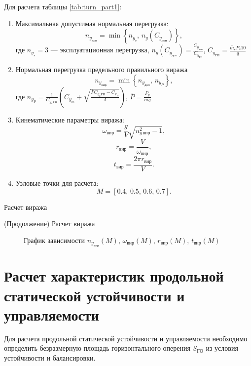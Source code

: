 Для расчета таблицы \ref{tab:turn_part1}: 
\begin{enumerate}
    \item Максимальная допустимая нормальная перегрузка:
        \[
            n_{y_{доп}}=\min \left\{ n_{y_{э}},\,n_y(C_{y_{доп}}) \right\},
        \]
        где $n_{y_{э}} = 3$ --- эксплуатационная перегрузка, $n_y(C_{y_{доп}}) = \frac{C_{y_{доп}}}{C_{y_{ГП}}}$,
        $C_{y_{ГП}} = \frac{\bar{m}_с P_s 10}{q}$
    \item Нормальная перегрузка предельного правильного виража
        \[
            n_{y_{вир}}=\min \left\{ n_{y_{доп}},\,n_{y_P} \right\},
        \]
        где $n_{y_{P}} = \frac{1}{C_{y_{a}ГП}} \left( C_{y_m} + \sqrt{
        \frac{\bar{P} C_{y_{a}ГП} - C_{x_{м}} }{A}} \right) $, $\bar{P} = \frac{P_p}{mg}$
    \item Кинематические параметры виража:
        \[
            \omega_{вир}  = \frac{g}{V} \sqrt{n_{y\, вир}^2 - 1},
        \]
        \[
            r_{вир} = \frac{V}{\omega_{вир}},
        \]
        \[
            t_{вир} = \frac{2 \pi r_{вир}}{V}.
        \]
        \item Узловые точки для расчета:
        \[
            M = [0.4,\, 0.5,\, 0.6,\,0.7].
        \]
\end{enumerate}

\begin{table}[H]
    \centering
    \caption{Расчет виража}
    \label{tab:turn_part1}
    
\end{table}

\addtocounter{table}{-1}
\addtocounter{totaltables}{-1}
\begin{table}[H]
    \centering
    \caption{(Продолжение) Расчет виража}
    \label{tab:turn_part2}
    
\end{table}
 
\begin{figure}[H]
\centering
\resizebox{.79\linewidth}{!}{}
\caption{График зависимости $n_{y_{вир}}(M)$, $\omega_{вир}(M)$, $r_{вир}(M)$, $t_{вир}(M)$}
\label{fig:turn}
\end{figure}

\section{Расчет характеристик продольной статической устойчивости и
управляемости}

Для расчета продольной статической устойчивости и управляемости
необходимо определить безразмерную площадь горизонтального оперения
$\bar{S}_{ГО}$ из условия устойчивости и
балансировки.

